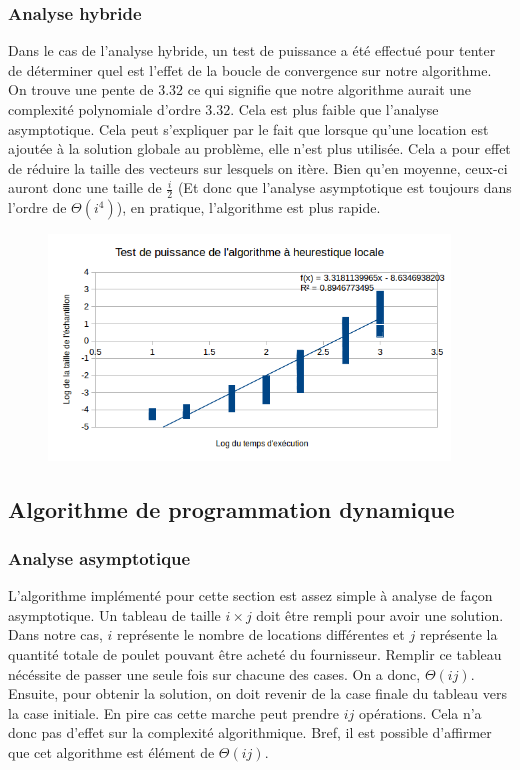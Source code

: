 \documentclass[a4paper, 12pt]{article} %
\begin{document}
\subsubsection*{Analyse hybride}
    Dans le cas de l'analyse hybride, un test de puissance a été effectué pour tenter de déterminer quel est l'effet
    de la boucle de convergence sur notre algorithme. On trouve une pente de $3.32$ ce qui signifie que notre algorithme
    aurait une complexité polynomiale d'ordre $3.32$. Cela est plus faible que l'analyse asymptotique. Cela peut s'expliquer
    par le fait que lorsque qu'une location est ajoutée à la solution globale au problème, elle n'est plus utilisée. Cela
    a pour effet de réduire la taille des vecteurs sur lesquels on itère. Bien qu'en moyenne, ceux-ci auront donc une taille
    de $\frac{i}{2}$ (Et donc que l'analyse asymptotique est toujours dans l'ordre de $\Theta(i^{4})$), en pratique, 
    l'algorithme est plus rapide.
\begin{figure}[H]
    \centering
    \includegraphics[width=0.95\textwidth]{Figure/AlgorithmeLocale}
\end{figure}
\subsection*{Algorithme de programmation dynamique}
\subsubsection*{Analyse asymptotique}
    L'algorithme implémenté pour cette section est assez simple à analyse de façon
    asymptotique. Un tableau de taille $i\times j$ doit être rempli pour avoir une solution.
    Dans notre cas, $i$ représente le nombre de locations différentes et $j$ représente la quantité
    totale de poulet pouvant être acheté du fournisseur. Remplir ce tableau nécéssite de passer une seule
    fois sur chacune des cases. On a donc, $\Theta(ij)$. Ensuite, pour obtenir la solution, on doit 
    revenir de la case finale du tableau vers la case initiale. En pire cas cette marche peut prendre
    $ij$ opérations. Cela n'a donc pas d'effet sur la complexité algorithmique. Bref, il est possible 
    d'affirmer que cet algorithme est élément de $\Theta(ij)$.
\end{document}
